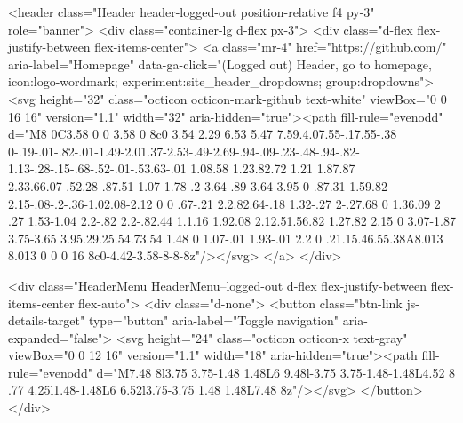     
    
    


        
<header class="Header header-logged-out  position-relative f4 py-3" role="banner">
  <div class="container-lg d-flex px-3">
    <div class="d-flex flex-justify-between flex-items-center">
        <a class="mr-4" href="https://github.com/" aria-label="Homepage" data-ga-click="(Logged out) Header, go to homepage, icon:logo-wordmark; experiment:site_header_dropdowns; group:dropdowns">
          <svg height="32" class="octicon octicon-mark-github text-white" viewBox="0 0 16 16" version="1.1" width="32" aria-hidden="true"><path fill-rule="evenodd" d="M8 0C3.58 0 0 3.58 0 8c0 3.54 2.29 6.53 5.47 7.59.4.07.55-.17.55-.38 0-.19-.01-.82-.01-1.49-2.01.37-2.53-.49-2.69-.94-.09-.23-.48-.94-.82-1.13-.28-.15-.68-.52-.01-.53.63-.01 1.08.58 1.23.82.72 1.21 1.87.87 2.33.66.07-.52.28-.87.51-1.07-1.78-.2-3.64-.89-3.64-3.95 0-.87.31-1.59.82-2.15-.08-.2-.36-1.02.08-2.12 0 0 .67-.21 2.2.82.64-.18 1.32-.27 2-.27.68 0 1.36.09 2 .27 1.53-1.04 2.2-.82 2.2-.82.44 1.1.16 1.92.08 2.12.51.56.82 1.27.82 2.15 0 3.07-1.87 3.75-3.65 3.95.29.25.54.73.54 1.48 0 1.07-.01 1.93-.01 2.2 0 .21.15.46.55.38A8.013 8.013 0 0 0 16 8c0-4.42-3.58-8-8-8z"/></svg>
        </a>
    </div>

    <div class="HeaderMenu HeaderMenu--logged-out d-flex flex-justify-between flex-items-center flex-auto">
      <div class="d-none">
        <button class="btn-link js-details-target" type="button" aria-label="Toggle navigation" aria-expanded="false">
          <svg height="24" class="octicon octicon-x text-gray" viewBox="0 0 12 16" version="1.1" width="18" aria-hidden="true"><path fill-rule="evenodd" d="M7.48 8l3.75 3.75-1.48 1.48L6 9.48l-3.75 3.75-1.48-1.48L4.52 8 .77 4.25l1.48-1.48L6 6.52l3.75-3.75 1.48 1.48L7.48 8z"/></svg>
        </button>
      </div>

